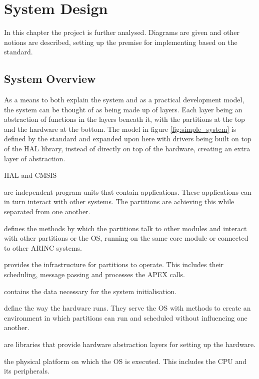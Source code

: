 
\chapter{System Design}
\label{chap:system_design}

In this chapter the project is further analysed. Diagrams are given
and other notions are described, setting up the premise for implementing
\OSname{} based on the \arinc{} standard.

\section{System Overview}
As a means to both explain the system and as a practical development
model, the system can be thought of as being made up of layers.
Each layer being an abstraction of functions in the layers beneath it,
with the partitions at the top and the hardware at the bottom.
The model in figure \ref{fig:simple_system} is defined by the \arinc{} standard
and expanded upon here with drivers being built on top of the HAL library,
instead of directly on top of the hardware, creating an extra layer of
abstraction.

\begin{labeling}{HAL and CMSIS}
	\item [\textbf{Partitions}]
		are independent program units that contain applications. These
		applications can in turn interact with other systems. The
		partitions are achieving this while separated from one another.
	\item [\textbf{APEX}]
		defines the methods by which the partitions talk to other
		modules and
		interact with other partitions or the OS, running
		on the same core module or connected to other ARINC systems.
	\item [\textbf{OS kernel}]
		provides the infrastructure for partitions to operate. This
		includes their scheduling, message passing and processes
		the APEX calls.
	\item [\textbf{Schema}]
		contains the data necessary for the system initialisation.
	\item [\textbf{Drivers}]
		define the way the hardware runs.
		They serve the OS with methods to create an environment in which
		partitions can run and scheduled without influencing one
		another.
	\item [\textbf{HAL and CMSIS}]
		are libraries that provide hardware abstraction layers for
		setting up the hardware.
	\item [\textbf{Hardware}]
		the physical platform on which the OS is executed. This
		includes the CPU and its peripherals.
\end{labeling}

